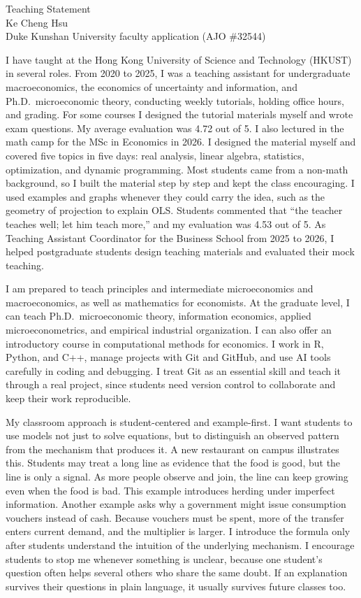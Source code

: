\documentclass[11pt]{article}
\begin{document}
\begin{center}
{\Large Teaching Statement}\\[0.3em]
Ke Cheng Hsu \\[0.2em]
{\small Duke Kunshan University faculty application (AJO \#32544)}
\end{center}

I have taught at the Hong Kong University of Science and Technology (HKUST) in several roles. From 2020 to 2025, I was a teaching assistant for undergraduate macroeconomics, the economics of uncertainty and information, and Ph.D.\ microeconomic theory, conducting weekly tutorials, holding office hours, and grading. For some courses I designed the tutorial materials myself and wrote exam questions. My average evaluation was 4.72 out of 5. I also lectured in the math camp for the MSc in Economics in 2026. I designed the material myself and covered five topics in five days: real analysis, linear algebra, statistics, optimization, and dynamic programming. Most students came from a non-math background, so I built the material step by step and kept the class encouraging. I used examples and graphs whenever they could carry the idea, such as the geometry of projection to explain OLS. Students commented that ``the teacher teaches well; let him teach more,'' and my evaluation was 4.53 out of 5. As Teaching Assistant Coordinator for the Business School from 2025 to 2026, I helped postgraduate students design teaching materials and evaluated their mock teaching.

I am prepared to teach principles and intermediate microeconomics and macroeconomics, as well as mathematics for economists. At the graduate level, I can teach Ph.D.\ microeconomic theory, information economics, applied microeconometrics, and empirical industrial organization. I can also offer an introductory course in computational methods for economics. I work in R, Python, and C++, manage projects with Git and GitHub, and use AI tools carefully in coding and debugging. I treat Git as an essential skill and teach it through a real project, since students need version control to collaborate and keep their work reproducible.

My classroom approach is student-centered and example-first. I want students to use models not just to solve equations, but to distinguish an observed pattern from the mechanism that produces it. A new restaurant on campus illustrates this. Students may treat a long line as evidence that the food is good, but the line is only a signal. As more people observe and join, the line can keep growing even when the food is bad. This example introduces herding under imperfect information. Another example asks why a government might issue consumption vouchers instead of cash. Because vouchers must be spent, more of the transfer enters current demand, and the multiplier is larger. I introduce the formula only after students understand the intuition of the underlying mechanism. I encourage students to stop me whenever something is unclear, because one student's question often helps several others who share the same doubt. If an explanation survives their questions in plain language, it usually survives future classes too.
\end{document}
